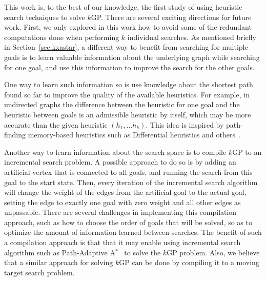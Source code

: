 \documentclass[twoside,11pt]{article}
\newcommand{\kgs}{$k$GP\xspace}
\newcommand{\astar}{A$^*$\xspace}
\newcommand{\roni}[1]{\textbf{[RS:#1]}}
\begin{document}
This work is, to the best of our knowledge, the first study of using heuristic search techniques to solve \kgs.
There are several exciting directions for future work.
First, we only explored in this work how to avoid some of the redundant computations done when performing $k$ individual searches.
As mentioned briefly in Section~\ref{sec:kxastar}, a different way to benefit from searching for multiple goals is to learn valuable information about the underlying graph while searching for one goal, and use this information to improve the search for the other goals. %

One way to learn such information so is use knowledge about the shortest path found so far to improve the quality of the available heuristics.
For example, in undirected graphs the difference between the heuristic for one goal and the heuristic between goals is an admissible heuristic by itself, which may be more accurate than the given heuristic $(h_1, \ldots h_k)$.
This idea is inspired by path-finding memory-based heuristics such as Differential heuristics and others~\cite{sturtevant2007memory,SturtevantFBSN2009,goldenberg2011theCompressed}.


Another way to learn information about the search space is to compile \kgs to an incremental search problem.
A possible approach to do so is by adding an artificial vertex that is connected to all goals, and running the search from this goal to the start state.
Then, every iteration of the incremental search algorithm will change the weight of the edges from the artificial goal to the actual goal, setting the edge to exactly one goal with zero weight and all other edges as unpassable.
There are several challenges in implementing this compilation approach, such as how to choose the order of goals that will be solved, so as to optimize the amount of information learned between searches.
The benefit of such a compilation approach is that that it may enable using incremental search algorithm such as Path-Adaptive \astar~\cite{hernandez2015reusing} to solve the \kgs problem.
Also, we believe that a similar approach for solving \kgs can be done by compiling it to a moving target search problem.
\end{document}
